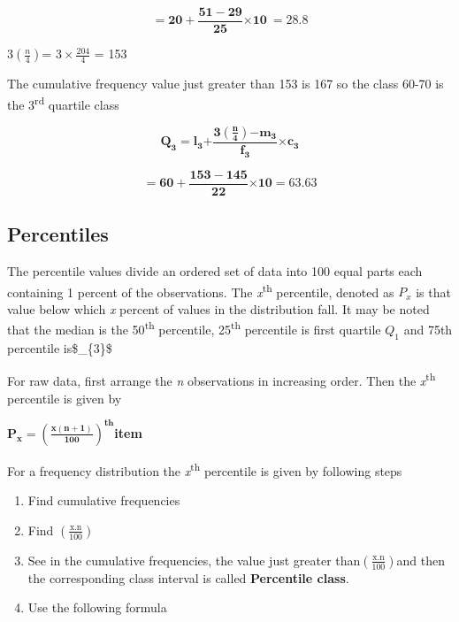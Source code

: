 \documentclass[
]{book}
\begin{document}
\[\mathbf{= 20 +}\frac{\mathbf{51 - 29}}{\mathbf{25}}\mathbf{\times 10\  = 28.8}\]

\(3\left( \frac{n}{4} \right)\)= \(3 \times \frac{204}{4}\) = 153

The cumulative frequency value just greater than 153 is 167 so the class
60-70 is the 3\textsuperscript{rd} quartile class

\[\mathbf{Q}_{\mathbf{3}}\mathbf{=}\mathbf{l}_{\mathbf{3}}\mathbf{+}\frac{\mathbf{3}\left( \frac{\mathbf{n}}{\mathbf{4}} \right)\mathbf{-}\mathbf{m}_{\mathbf{3}}}{\mathbf{f}_{\mathbf{3}}}\mathbf{\times}\mathbf{c}_{\mathbf{3}}\]

\[\mathbf{= 60 +}\frac{\mathbf{153 - 145}}{\mathbf{22}}\mathbf{\times 10 = 63.63}\]

\hypertarget{percentiles}{%
\subsection{Percentiles}\label{percentiles}}

The percentile values divide an ordered set of data into 100 equal parts
each containing 1 percent of the observations. The \emph{x}\textsuperscript{th} percentile,
denoted as \(P_{x}\) is that value below which \emph{x} percent of values in
the distribution fall. It may be noted that the median is the 50\textsuperscript{th}
percentile, 25\textsuperscript{th} percentile is first quartile \(Q_{1}\) and 75th
percentile is\$\_\{3\}\$

For raw data, first arrange the \emph{n} observations in increasing order.
Then the \emph{x}\textsuperscript{th} percentile is given by

\(\mathbf{P}_{\mathbf{x}}\mathbf{=}\left( \frac{\mathbf{x}\left( \mathbf{n + 1} \right)}{\mathbf{100}} \right)^{\mathbf{\text{th}}}\)\textbf{item}

For a frequency distribution the \emph{x}\textsuperscript{th} percentile is given by
following steps

\begin{enumerate}
\def\labelenumi{\arabic{enumi}.}
\item
  Find cumulative frequencies
\item
  Find \(\left( \frac{\text{x.n}}{100} \right)\)
\item
  See in the cumulative frequencies, the value just greater
  than\(\left( \frac{\text{x.n}}{100} \right)\)and then the
  corresponding class interval is called \textbf{Percentile class}.
\item
  Use the following formula
\end{enumerate}
\end{document}

